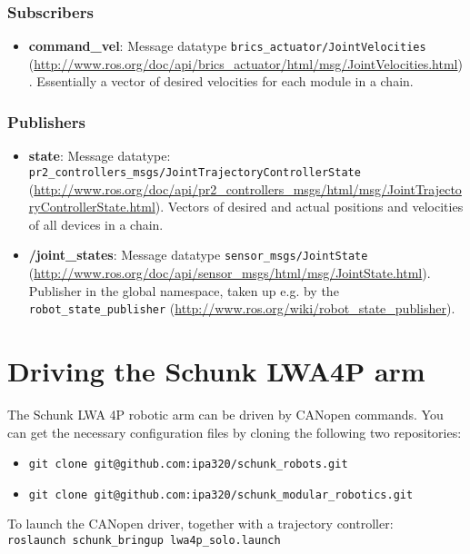 \subsubsection{Subscribers}

\begin{itemize}
\item {\bf command\_vel}: Message datatype \texttt{brics\_actuator/JointVelocities} (\url{http://www.ros.org/doc/api/brics_actuator/html/msg/JointVelocities.html}). Essentially a vector of desired velocities for each module in a chain.
\end{itemize}

\subsubsection{Publishers}

\begin{itemize}
\item {\bf state}: Message datatype: \texttt{pr2\_controllers\_msgs/JointTrajectoryControllerState} (\url{http://www.ros.org/doc/api/pr2_controllers_msgs/html/msg/JointTrajectoryControllerState.html}). Vectors of desired and actual positions and velocities of all devices in a chain.
\item {\bf /joint\_states}: Message datatype \texttt{sensor\_msgs/JointState} (\url{http://www.ros.org/doc/api/sensor_msgs/html/msg/JointState.html}). Publisher in the global namespace, taken up e.g. by the \texttt{robot\_state\_publisher} (\url{http://www.ros.org/wiki/robot_state_publisher}).
\end{itemize}

\section{Driving the Schunk LWA4P arm}

The Schunk LWA 4P robotic arm can be driven by CANopen commands. You can get the necessary configuration files by cloning the following two repositories:
\begin{itemize}
\item \texttt{git clone git@github.com:ipa320/schunk\_robots.git}
\item \texttt{git clone git@github.com:ipa320/schunk\_modular\_robotics.git}
\end{itemize}

To launch the CANopen driver, together with a trajectory controller:\\
\texttt{roslaunch schunk\_bringup lwa4p\_solo.launch}

